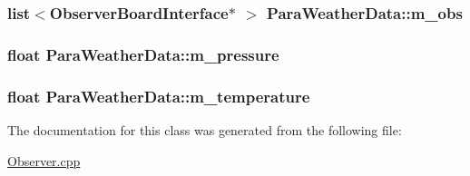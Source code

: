 \subsubsection[{\texorpdfstring{m\+\_\+obs}{m_obs}}]{\setlength{\rightskip}{0pt plus 5cm}list$<${\bf Observer\+Board\+Interface}$\ast$ $>$ Para\+Weather\+Data\+::m\+\_\+obs\hspace{0.3cm}{\ttfamily [private]}}\hypertarget{classParaWeatherData_a876526d1f935d81abc5337051a76334a}{}\label{classParaWeatherData_a876526d1f935d81abc5337051a76334a}
\subsubsection[{\texorpdfstring{m\+\_\+pressure}{m_pressure}}]{\setlength{\rightskip}{0pt plus 5cm}float Para\+Weather\+Data\+::m\+\_\+pressure\hspace{0.3cm}{\ttfamily [private]}}\hypertarget{classParaWeatherData_a5e154d46c7b4444aeebb966383eba5b8}{}\label{classParaWeatherData_a5e154d46c7b4444aeebb966383eba5b8}
\subsubsection[{\texorpdfstring{m\+\_\+temperature}{m_temperature}}]{\setlength{\rightskip}{0pt plus 5cm}float Para\+Weather\+Data\+::m\+\_\+temperature\hspace{0.3cm}{\ttfamily [private]}}\hypertarget{classParaWeatherData_aca752f57b1b7c7a71556cb778b894ff3}{}\label{classParaWeatherData_aca752f57b1b7c7a71556cb778b894ff3}


The documentation for this class was generated from the following file\+:\begin{DoxyCompactItemize}
\item 
\hyperlink{Observer_8cpp}{Observer.\+cpp}\end{DoxyCompactItemize}
